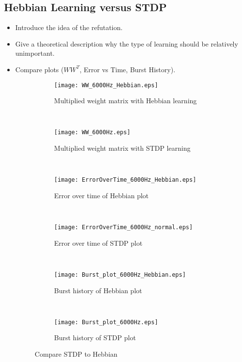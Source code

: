 \subsection{Hebbian Learning versus STDP}

\begin{itemize}
\item Introduce the idea of the refutation. 
\item Give a theoretical description why the type of learning should be relatively unimportant.
\item Compare plots (\(WW^T\), Error vs Time, Burst History).

\begin{figure}[H]
\centering
\begin{subfigure}[b]{0.49\textwidth}
\texttt{[image: WW\_6000Hz\_Hebbian.eps]}
\label{Compare: WW_Hebbian}
\caption{Multiplied weight matrix with Hebbian learning}
\end{subfigure}
\,
\begin{subfigure}[b]{0.49\textwidth}
\texttt{[image: WW\_6000Hz.eps]}
\label{Compare: WW_STDP}
\caption{Multiplied weight matrix with STDP learning}
\end{subfigure}
\\
\begin{subfigure}[b]{0.49\textwidth}
\texttt{[image: ErrorOverTime\_6000Hz\_Hebbian.eps]}
\label{Compare: EoT_Hebbian}
\caption{Error over time of Hebbian plot}
\end{subfigure}
\,
\begin{subfigure}[b]{0.49\textwidth}
\texttt{[image: ErrorOverTime\_6000Hz\_normal.eps]}
\label{Compare: EoT_STDP}
\caption{Error over time of STDP plot}
\end{subfigure}
\\
\begin{subfigure}[b]{0.49\textwidth}
\texttt{[image: Burst\_plot\_6000Hz\_Hebbian.eps]}
\label{Compare: BH_Hebbian}
\caption{Burst history of Hebbian plot}
\end{subfigure}
\,
\begin{subfigure}[b]{0.49\textwidth}
\texttt{[image: Burst\_plot\_6000Hz.eps]}
\label{Compare: BH_STDP}
\caption{Burst history of STDP plot}
\end{subfigure}
\label{Compare}
\caption{Compare STDP to Hebbian}
\end{figure}
\end{itemize}